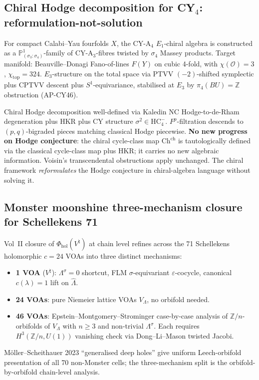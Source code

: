 \documentclass[11pt]{article}
\begin{document}
\subsection{Chiral Hodge decomposition for CY$_4$: reformulation-not-solution}

For compact Calabi--Yau fourfolds $X$, the CY-A$_4$ $E_1$-chiral
algebra is constructed as a $\mathbb{P}^1_{(\sigma_3 : \sigma_4)}$-family
of CY-A$_3$-fibres twisted by $\sigma_4$ Massey products. Target
manifold: Beauville--Donagi Fano-of-lines $F(Y)$ on cubic 4-fold,
with $\chi(\mathcal{O}) = 3$, $\chi_{\mathrm{top}} = 324$.
$E_3$-structure on the total space via PTVV $(-2)$-shifted
symplectic plus CPTVV descent plus $S^1$-equivariance, stabilised
at $E_3$ by $\pi_4(BU) = \mathbb{Z}$ obstruction (AP-CY46).

Chiral Hodge decomposition well-defined via Kaledin NC Hodge-to-de-Rham
degeneration plus HKR plus CY structure $\sigma^2 \in \mathrm{HC}^-_4$.
$F^p$-filtration descends to $(p,q)$-bigraded pieces matching classical
Hodge piecewise. \textbf{No new progress on Hodge conjecture}: the
chiral cycle-class map $\mathrm{Ch}^{\mathrm{ch}}$ is tautologically
defined via the classical cycle-class map plus HKR; it carries no
new algebraic information. Voisin's transcendental obstructions
apply unchanged. The chiral framework \emph{reformulates} the Hodge
conjecture in chiral-algebra language without solving it.

\subsection{Monster moonshine three-mechanism closure for Schellekens 71}

Vol~II closure of $\Phi_{\mathrm{hol}}(V^{\natural})$ at chain level
refines across the 71 Schellekens holomorphic $c=24$ VOAs into three
distinct mechanisms:
\begin{itemize}
\item \textbf{1 VOA} ($V^{\natural}$): $\Lambda^{\sigma} = 0$
shortcut, FLM $\sigma$-equivariant $\varepsilon$-cocycle, canonical
$c(\lambda) = 1$ lift on $\widehat{\Lambda}$.
\item \textbf{24 VOAs}: pure Niemeier lattice VOAs $V_{\Lambda}$,
no orbifold needed.
\item \textbf{46 VOAs}: Epstein--Montgomery--Strominger case-by-case
analysis of $\mathbb{Z}/n$-orbifolds of $V_{\Lambda}$ with
$n \geq 3$ and non-trivial $\Lambda^{\sigma}$. Each requires
$H^3(\mathbb{Z}/n, U(1))$ vanishing check via Dong--Li--Mason
twisted Jacobi.
\end{itemize}
Möller--Scheithauer 2023 ``generalised deep holes'' give uniform
Leech-orbifold presentation of all 70 non-Monster cells; the
three-mechanism split is the orbifold-by-orbifold chain-level
analysis.
\end{document}
